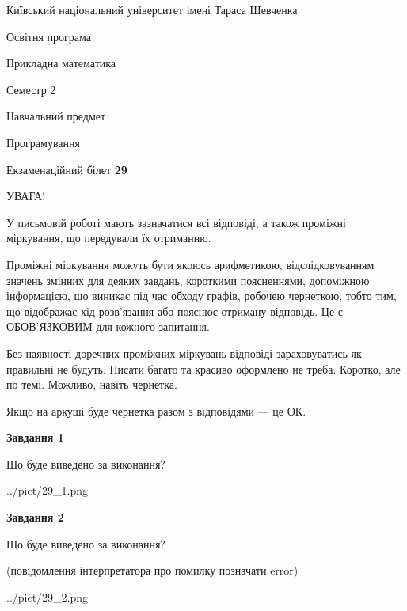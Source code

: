\documentclass[12pt, ukrainian]{article}
\begin{document}
{{\begin {small}\par
{ \center  Київський національний університет імені Тараса Шевченка \par}
{\parbox {5 cm}{Освітня програма \hfill}{\parbox {7 cm}{Прикладна математика\hfill}}\parbox {6 cm}{\hfill Семестр 2}}\par
{\parbox {5 cm} {Навчальний предмет \hfill}\parbox {7 cm}{Програмування \hfill}\parbox {6cm}{\hfill}\par}\vspace{-7pt} \end{small}}{\center Екзаменаційний білет \No \textbf
{ 29 }\par}}
{
\begin {large}
УВАГА!

У письмовій роботі мають зазначатися всі відповіді, а також проміжні міркування, що передували їх отриманню.

Проміжні міркування можуть бути якоюсь арифметикою, відслідковуванням зна\-чень змінних для деяких завдань,
короткими поясненнями, допоміжною інформацією, що виникає під час обходу графів, робочею чернеткою,
тобто тим, що відображає хід розв’язання або пояснює отриману відповідь.
Це є ОБОВ’ЯЗКОВИМ для кожного запитання.

Без наявності доречних проміжних міркувань відповіді зараховуватись як правиль\-ні не будуть.
Писати багато та красиво оформлено не треба. Коротко, але по темі. Можли\-во, навіть чернетка.

Якщо на аркуші буде чернетка разом з відповідями --- це ОК.

\newpage

{\begin {center}\textbf{Завдання 1}\end {center}}\par
Що буде виведено за виконання?\par
\begin{center}
	{../pict/29_1.png}
\end{center}
\newpage

{\begin {center}\textbf{Завдання 2}\end {center}}\par
Що буде виведено за виконання?\par
 (повідомлення інтерпретатора про помилку позначати error)\par
\begin{center}
	{../pict/29_2.png}
\end{center}
\newpage


\end{large}}
\end{document}

